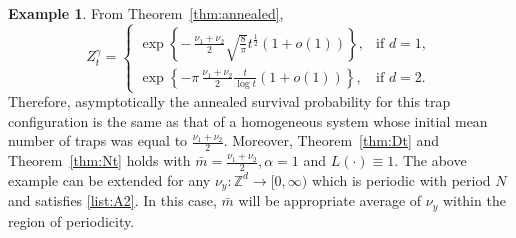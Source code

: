 \documentclass{article}[12pt]
\theoremstyle{definition}
\newtheorem{example}{Example}[section]
\newcommand{\Z}{\mathbb{Z}}
\newcommand{\1}{\mathbbm{1}}
\begin{document}
\begin{example}
  From Theorem~\ref{thm:annealed},
  \begin{equation}
        Z^{\gamma}_t = \begin{cases}
            \exp\left\{- \, \frac{\nu_1+\nu_2}{2}\sqrt{\frac{8}{\pi}}t^{\frac{1}{2}}(1+o(1))\right\},& \text{if } d=1,\\
        \exp\left\{- {\pi\,\frac{\nu_1+\nu_2}{2}\frac{t}{\log t}(1+o(1))}\right\}, & \text{if } d=2.
        \end{cases}
        \label{eqn:annealed periodic result}
    \end{equation}
    Therefore, asymptotically the annealed survival probability for this trap configuration is the same as that of a homogeneous system whose initial mean number of traps was equal to $\frac{\nu_1+\nu_2}{2}$. Moreover, Theorem~\ref{thm:Dt} and Theorem~\ref{thm:Nt} holds with $\bar{m} = \frac{\nu_1+\nu_2}{2}, \alpha = 1$ and $L(\cdot) \equiv 1$. The above example can be extended for any $\nu_y:\Z^d \rightarrow [0,\infty)$ which is periodic with period $N$ and satisfies \ref{list:A2}. In this case, $\bar{m}$ will be appropriate average of $\nu_y$ within the region of periodicity. 
 \end{example}
\end{document}
